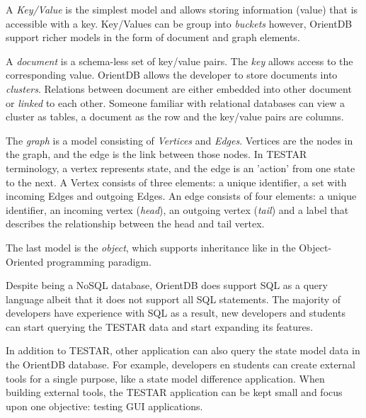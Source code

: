     A \hypertarget{db:key-value}{\emph{Key/Value}} is the simplest model and allows storing information (value) that is accessible with a key. Key/Values can be group into \textit{buckets} however, OrientDB support richer models in the form of document and graph elements. 

    A \hypertarget{db:document}{\emph{document}} is a schema-less set of key/value pairs. The \emph{key} allows access to the corresponding value. OrientDB allows the developer to store documents into \emph{clusters}. Relations between document are either embedded into other document or \emph{linked} to each other. Someone familiar with relational databases can view a cluster as tables, a document as the row and the key/value pairs are columns. 
    
    The \hypertarget{db:graph}{\emph{graph}} is a model consisting of \emph{Vertices} and \emph{Edges}. Vertices are the nodes in the graph, and the edge is the link between those nodes. In TESTAR terminology, a vertex represents state, and the edge is an 'action' from one state to the next. A Vertex consists of three elements: a unique identifier, a set with incoming Edges and outgoing Edges. An edge consists of four elements: a unique identifier, an incoming vertex (\emph{head}), an outgoing vertex (\emph{tail}) and a label that describes the relationship between the head and tail vertex. 

    The last model is the \hypertarget{db:object}{\emph{object}}, which supports inheritance like in the Object-Oriented programming paradigm.

    Despite being a NoSQL database, OrientDB does support SQL as a query language \cite{sql-lang} albeit that it does not support all SQL statements. The majority of developers have experience with SQL \cite{sql-stats} as a result, new developers and students can start querying the TESTAR data and start expanding its features.
    
    In addition to TESTAR, other application can also query the state model data in the OrientDB database. For example, developers en students can create external tools for a single purpose, like a state model difference application. When building external tools, the TESTAR application can be kept small and focus upon one objective: testing GUI applications. 